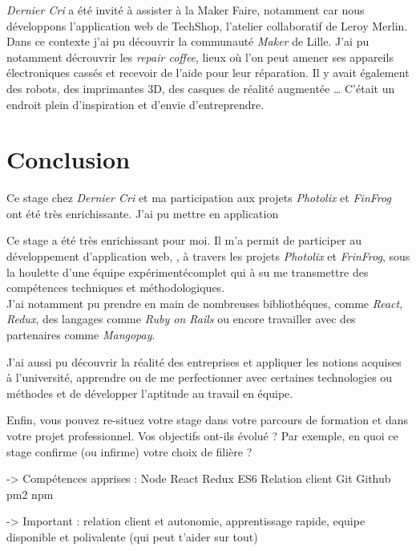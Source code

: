 \documentclass[12pt,a4paper]{article}
\begin{document}
  \bigskip

  \emph{Dernier Cri} a été invité à assister à la Maker Faire, notamment
  car nous développons l'application web de TechShop, l'atelier
  collaboratif de Leroy Merlin. Dans ce contexte j'ai pu découvrir la
  communauté \emph{Maker} de Lille. J'ai pu notamment décrouvrir les
  \emph{repair coffee}, lieux où l'on peut amener ses appareils
  électroniques cassés et recevoir de l'aide pour leur réparation. Il y
  avait également des robots, des imprimantes 3D, des casques de réalité
  augmentée \ldots{} C'était un endroit plein d'inspiration et d'envie
  d'entreprendre.

  \newpage

  \section{Conclusion}\label{conclusion-2}

  Ce stage chez \emph{Dernier Cri} et ma participation aux projets
  \emph{Photolix} et \emph{FinFrog} ont été très enrichissante. J'ai pu
  mettre en application

  \bigskip

  Ce stage a été très enrichissant pour moi. Il m'a permit de participer
  au développement d'application web, , à travers les projets
  \emph{Photolix} et \emph{FrinFrog}, sous la houlette d'une équipe
  expérimentécomplet qui à su me transmettre des compétences techniques et
  méthodologiques.\\
  J'ai notamment pu prendre en main de nombreuses bibliothéques, comme
  \emph{React}, \emph{Redux}, des langages comme \emph{Ruby on Rails} ou
  encore travailler avec des partenaires comme \emph{Mangopay}.

  \bigskip

  J'ai aussi pu découvrir la réalité des entreprises et appliquer les
  notions acquises à l'université, apprendre ou de me perfectionner avec
  certaines technologies ou méthodes et de développer l'aptitude au
  travail en équipe.

  \bigskip

  Enfin, vous pouvez re-situez votre stage dans votre parcours de
  formation et dans votre projet professionnel. Vos objectifs ont-ils
  évolué ? Par exemple, en quoi ce stage confirme (ou infirme) votre choix
  de filière ?

  -\textgreater{} Compétences apprises : Node React Redux ES6 Relation
  client Git Github pm2 npm

  -\textgreater{} Important : relation client et autonomie, apprentissage
  rapide, equipe disponible et polivalente (qui peut t'aider sur tout)
\end{document}
